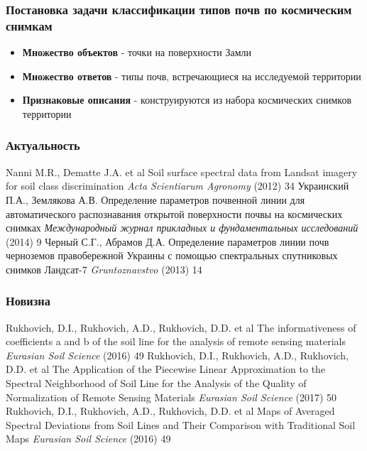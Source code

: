 \documentclass{beamer}
\begin{document}
\begin{frame}
\frametitle{Постановка задачи классификации типов почв по космическим снимкам}
\begin{itemize}
\item \textbf{Множество объектов} - точки на поверхности Замли
\item \textbf{Множество ответов} - типы почв, встречающиеся на исследуемой территории
\item \textbf{Признаковые описания} - конструируются из набора космических снимков территории
\end{itemize}
\end{frame}

\begin{frame}
\frametitle{Актуальность}
\footnotesize{
\begin{thebibliography}{9}
\bibitem[]{} Nanni M.R., Dematte J.A. et al
\newblock Soil surface spectral data from Landsat imagery for soil class discrimination
\newblock \emph{Acta Scientiarum Agronomy} (2012) 34
\bibitem[]{} Украинский П.А., Землякова А.В.
\newblock Определение параметров почвенной линии
для автоматического распознавания открытой поверхности почвы на космических снимках
\newblock \emph{Международный журнал прикладных и фундаментальных исследований} (2014) 9
\bibitem[]{} Черный С.Г., Абрамов Д.А.
\newblock Определение параметров линии почв черноземов
правобережной Украины с помощью спектральных спутниковых снимков Ландсат-7
\newblock \emph{Gruntoznavstvo} (2013) 14
\end{thebibliography}}
\end{frame}

\begin{frame}
\frametitle{Новизна}
\footnotesize{
\begin{thebibliography}{9}
\bibitem[]{} Rukhovich, D.I., Rukhovich, A.D., Rukhovich, D.D. et al
\newblock The informativeness of coefficients a and b of the
soil line for the analysis of remote sensing materials
\newblock \emph{Eurasian Soil Science} (2016) 49
\bibitem[]{} Rukhovich, D.I., Rukhovich, A.D., Rukhovich, D.D. et al
\newblock The Application of the Piecewise Linear Approximation
to the Spectral Neighborhood of Soil Line for the Analysis
of the Quality of Normalization of Remote Sensing Materials
\newblock \emph{Eurasian Soil Science} (2017) 50
\bibitem[]{} Rukhovich, D.I., Rukhovich, A.D., Rukhovich, D.D. et al
\newblock  Maps of Averaged Spectral Deviations from Soil Lines
and Their Comparison with Traditional Soil Maps
\newblock \emph{Eurasian Soil Science} (2016) 49
\end{thebibliography}}
\end{frame}
\end{document}
